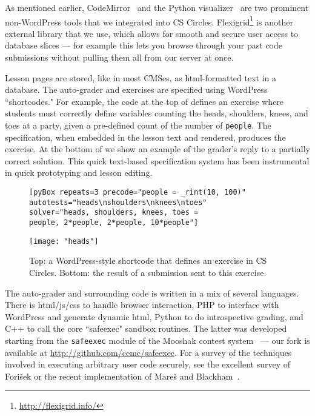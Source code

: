 \documentclass{article}
\begin{document}
{As mentioned earlier, CodeMirror~\cite{Haverbeke1x} and the Python visualizer~\cite{Guo11} are two prominent non-WordPress tools that we integrated into CS Circles. Flexigrid\footnote{\url{http://flexigrid.info/}} is another external library that we use, which allows for smooth and secure user access to database slices --- for example this lets you browse through your past code submissions without pulling them all from our server at once.

Lesson pages are stored, like in most CMSes, as html-formatted text in a database. The auto-grader and exercises are specified using WordPress ``shortcodes." For example, the code at the top of  defines an exercise where students must correctly define variables counting the heads, shoulders, knees, and toes at a party, given a pre-defined count of the number of {\tt people}.
The specification, when embedded in the lesson text and rendered, produces the exercise. At the bottom of  we show an example of the grader's reply to a partially correct solution. This quick text-based specification system has been instrumental in quick prototyping and lesson editing.

\begin{figure}
\centering
\begin{minipage}{10cm}
\begin{verbatim}
[pyBox repeats=3 precode="people = _rint(10, 100)"
autotests="heads\nshoulders\nknees\ntoes"
solver="heads, shoulders, knees, toes =
people, 2*people, 2*people, 10*people"]
\end{verbatim}
\end{minipage}
\vspace{0em}
\texttt{[image: "heads"]} \caption{Top: a WordPress-style shortcode that defines an exercise in CS Circles. Bottom: the result of a submission sent to this exercise.}\label{fig:heads}
\end{figure}


The auto-grader and surrounding code is written in a mix of several languages. There is html/js/css to handle browser interaction, PHP to interface with WordPress and generate dynamic html, Python to do introspective grading, and C++ to call the core ``safeexec" sandbox routines. The latter was developed starting from the {\tt safeexec} module of the Mooshak contest system~\cite{LS03} --- our fork is available at \url{http://github.com/cemc/safeexec}. For a survey of the techniques involved in executing arbitrary user code securely, see the excellent survey of Fori{\v s}ek \cite{Forisek06} or the recent implementation of Mare{\v s} and Blackham~\cite{MB12}.

}
\end{document}
